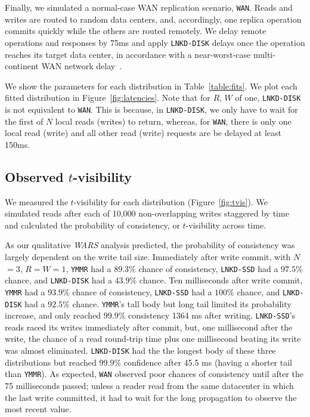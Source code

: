 \documentclass{vldb}
\begin{document}
Finally, we simulated a normal-case WAN replication scenario,
\texttt{WAN}.  Reads and writes are routed to random data centers,
and, accordingly, one replica operation commits quickly while the
others are routed remotely.  We delay remote operations and responses
by 75ms and apply \texttt{LNKD-DISK} delays once the operation reaches its
target data center, in accordance with a near-worst-case
multi-continent WAN network delay~\cite{dean-keynote}.

We show the parameters for each distribution in
Table~\ref{table:fits}. We plot each fitted distribution in
Figure~\ref{fig:latencies}.  Note that for $R$, $W$ of one,
\texttt{LNKD-DISK} is not equivalent to \texttt{WAN}.  This is
because, in \texttt{LNKD-DISK}, we only have to wait for the first of
$N$ local reads (writes) to return, whereas, for \texttt{WAN}, there
is only one local read (write) and all other read (write) requests
are be delayed at least 150ms.

\subsection{Observed $t$-visibility}

We measured the $t$-visibility for each distribution
(Figure~\ref{fig:tvis}).  We simulated reads
after each of 10,000 non-overlapping writes staggered by time
and calculated the probability of consistency, or 
$t$-visibility across time.

As our qualitative \textit{WARS} analysis predicted, the probability
of consistency was largely dependent on the write tail size.
Immediately after write commit, with $N$$=$$3$, $R$$=$$W$$=$$1$,
\texttt{YMMR} had a $89.3\%$ chance of consistency, \texttt{LNKD-SSD}
had a $97.5\%$ chance, and \texttt{LNKD-DISK} had a $43.9\%$ chance.
Ten milliseconds after write commit, \texttt{YMMR} had a $93.9\%$
chance of consistency, \texttt{LNKD-SSD} had a $100\%$ chance, and
\texttt{LNKD-DISK} had a $92.5\%$ chance.  \texttt{YMMR}'s tall body
but long tail limited its probability increase, and only reached
$99.9\%$ consistency 1364 ms after writing.  \texttt{LNKD-SSD}'s reads
raced its writes immediately after commit, but, one millisecond after
the write, the chance of a read round-trip time plus one millisecond
beating its write was almost eliminated.  \texttt{LNKD-DISK} had the
the longest body of these three distributions but reached $99.9\%$
confidence after 45.5 ms (having a shorter tail than \texttt{YMMR}).  As
expected, \texttt{WAN} observed poor chances of consistency until
after the 75 milliseconds passed; unless a reader read from the same
datacenter in which the last write committed, it had to wait for the
long propagation to observe the most recent value.
\end{document}

